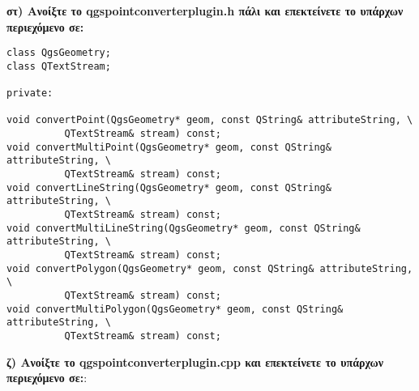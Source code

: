 \textbf{στ)  Aνοίξτε το qgspointconverterplugin.h πάλι και επεκτείνετε το υπάρχων περιεχόμενο σε:}

\begin{verbatim}
class QgsGeometry;
class QTextStream;

private:

void convertPoint(QgsGeometry* geom, const QString& attributeString, \
		  QTextStream& stream) const;
void convertMultiPoint(QgsGeometry* geom, const QString& attributeString, \
		  QTextStream& stream) const;
void convertLineString(QgsGeometry* geom, const QString& attributeString, \
		  QTextStream& stream) const;
void convertMultiLineString(QgsGeometry* geom, const QString& attributeString, \
		  QTextStream& stream) const;
void convertPolygon(QgsGeometry* geom, const QString& attributeString, \
		  QTextStream& stream) const;
void convertMultiPolygon(QgsGeometry* geom, const QString& attributeString, \
		  QTextStream& stream) const;
\end{verbatim}

\textbf{ζ) Ανοίξτε το qgspointconverterplugin.cpp και επεκτείνετε το υπάρχων περιεχόμενο σε:}:

